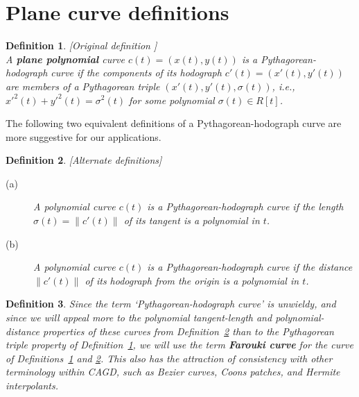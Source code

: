 
\SingleSpace
\setlength{\oddsidemargin}{0pt}
\setlength{\evensidemargin}{0pt}
\setlength{\headsep}{0pt}
\setlength{\topmargin}{0pt}
\setlength{\textheight}{9in}
\setlength{\textwidth}{6.5in}
\setlength{\parindent}{0in}
\setlength{\parskip}{.1in}

\newtheorem{rmk}{Remark}[section]
\newtheorem{dfn}{Definition}[section]
\newtheorem{prop}{Property}[section]
\newtheorem{propn}{Proposition}[section]




\section{Plane curve definitions}

\begin{dfn}
\label{def-plane}
[Original definition \cite{FS90}] \\
A {\bf plane polynomial} curve $c(t) = (x(t),y(t))$
is a {\em Pythagorean-hodograph curve}
if the components of its hodograph $c'(t) = (x'(t),y'(t))$
are members of a Pythagorean triple $(x'(t),y'(t),\sigma(t))$,
{\em i.e.}, $x'^2(t) + y'^2(t) = \sigma^2(t)$ for some
polynomial $\sigma(t) \in R[t]$.
\end{dfn}

The following two equivalent definitions of a 
Pythagorean-hodograph curve are more suggestive for our 
applications.

\begin{dfn}
\label{def:alt}
[Alternate definitions]
\begin{description}
\item[(a)]
A polynomial curve $c(t)$
is a {\em Pythagorean-hodograph curve} if
the length $\sigma(t) = \| c'(t) \|$ of its tangent
is a polynomial in $t$.

\item[(b)]
A polynomial curve $c(t)$
is a {\em Pythagorean-hodograph curve} if
the distance $\| c'(t) \|$ of its hodograph from the origin
is a polynomial in $t$.
\end{description}
\end{dfn}

\begin{dfn}
Since the term `Pythagorean-hodograph curve' is unwieldy,
and since we will appeal more to the polynomial tangent-length
and polynomial-distance properties of these curves from
Definition~\ref{def:alt}
than to the Pythagorean triple property of Definition~\ref{def-plane},
we will use the term {\bf Farouki curve} for the curve
of Definitions~\ref{def-plane} and \ref{def:alt}.
This also has the attraction of consistency with other terminology
within CAGD, such as Bezier curves, Coons patches, and Hermite
interpolants.
\end{dfn}

